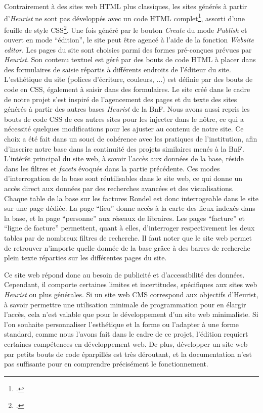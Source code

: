Contrairement à des sites web HTML plus classiques, les sites générés à partir d'\emph{Heurist} ne sont pas développés avec un code HTML complet\footcite[Le langage HTML (\emph{Hypertext Markup Language}), est un langage de programmation déclarative, de description de l'information]{margaux_faure_2025}, assorti d'une feuille de style CSS\footcite[Le langage CSS (\emph{Cascading Style Sheets}), permet de travailler l'apparence d'un site web en lui appliquant des règles de style]{margaux_faure_2025}. 
Une fois généré par le bouton \emph{Create} du mode \emph{Publish} et ouvert en mode \enquote{édition}, le site peut être agencé à l'aide de la fonction \emph{Website editor}. Les pages du site sont choisies parmi des formes pré-conçues prévues par \emph{Heurist}. Son contenu textuel est géré par des bouts de code HTML à placer dans des formulaires de saisie répartis à différents endroits de l'éditeur du site. L'esthétique du site (polices d'écriture, couleurs, ...) est définie par des bouts de code en CSS, également à saisir dans des formulaires. Le site créé dans le cadre de notre projet s'est inspiré de l'agencement des pages et du texte des sites générés à partir des autres bases \emph{Heurist} de la BnF. Nous avons aussi repris les bouts de code CSS de ces autres sites pour les injecter dans le nôtre, ce qui a nécessité quelques modifications pour les ajuster au contenu de notre site. Ce choix a été fait dans un souci de cohérence avec les pratiques de l'institution, afin d'inscrire notre base dans la continuité des projets similaires menés à la BnF. L'intérêt principal du site web, à savoir l'accès aux données de la base, réside dans les filtres et \emph{facets} évoqués dans la partie précédente. Ces modes d'interrogation de la base sont réutilisables dans le site web, ce qui donne un accès direct aux données par des recherches avancées et des visualisations. Chaque table de la base sur les factures Rondel est donc interrogeable dans le site sur une page dédiée. La page \enquote{lieu} donne accès à la carte des lieux indexés dans la base, et la page \enquote{personne} aux réseaux de libraires. Les pages \enquote{facture} et \enquote{ligne de facture} permettent, quant à elles, d'interroger respectivement les deux tables par de nombreux filtres de recherche. Il faut noter que le site web permet de retrouver n'importe quelle donnée de la base grâce à des barres de recherche plein texte réparties sur les différentes pages du site. 

Ce site web répond donc au besoin de publicité et d'accessibilité des données. Cependant, il comporte certaines limites et incertitudes, spécifiques aux sites web \emph{Heurist} ou plus générales. Si un site web CMS correspond aux objectifs d'Heurist, à savoir permettre une utilisation minimale de programmation pour en élargir l'accès, cela n'est valable que pour le développement d'un site web minimaliste. Si l'on souhaite personnaliser l'esthétique et la forme ou l'adapter à une forme standard, comme nous l'avons fait dans le cadre de ce projet, l'édition requiert certaines compétences en développement web. De plus, développer un site web par petits bouts de code éparpillés est très déroutant, et la documentation n'est pas suffisante pour en comprendre précisément le fonctionnement. 

